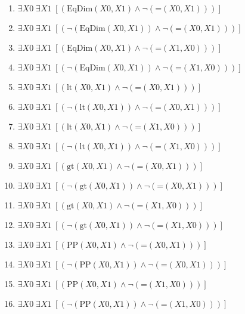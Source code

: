 \documentclass{article}
\begin{document}
\begin{enumerate}
\item $\exists X0\; \exists X1\;  \left[ \left(\textrm{EqDim}(X0,X1) \land \neg \left(\textrm{=}(X0,X1)\right)\right) \right]$
\item $\exists X0\; \exists X1\;  \left[ \left(\neg \left(\textrm{EqDim}(X0,X1)\right) \land \neg \left(\textrm{=}(X0,X1)\right)\right) \right]$
\item $\exists X0\; \exists X1\;  \left[ \left(\textrm{EqDim}(X0,X1) \land \neg \left(\textrm{=}(X1,X0)\right)\right) \right]$
\item $\exists X0\; \exists X1\;  \left[ \left(\neg \left(\textrm{EqDim}(X0,X1)\right) \land \neg \left(\textrm{=}(X1,X0)\right)\right) \right]$
\item $\exists X0\; \exists X1\;  \left[ \left(\textrm{lt}(X0,X1) \land \neg \left(\textrm{=}(X0,X1)\right)\right) \right]$
\item $\exists X0\; \exists X1\;  \left[ \left(\neg \left(\textrm{lt}(X0,X1)\right) \land \neg \left(\textrm{=}(X0,X1)\right)\right) \right]$
\item $\exists X0\; \exists X1\;  \left[ \left(\textrm{lt}(X0,X1) \land \neg \left(\textrm{=}(X1,X0)\right)\right) \right]$
\item $\exists X0\; \exists X1\;  \left[ \left(\neg \left(\textrm{lt}(X0,X1)\right) \land \neg \left(\textrm{=}(X1,X0)\right)\right) \right]$
\item $\exists X0\; \exists X1\;  \left[ \left(\textrm{gt}(X0,X1) \land \neg \left(\textrm{=}(X0,X1)\right)\right) \right]$
\item $\exists X0\; \exists X1\;  \left[ \left(\neg \left(\textrm{gt}(X0,X1)\right) \land \neg \left(\textrm{=}(X0,X1)\right)\right) \right]$
\item $\exists X0\; \exists X1\;  \left[ \left(\textrm{gt}(X0,X1) \land \neg \left(\textrm{=}(X1,X0)\right)\right) \right]$
\item $\exists X0\; \exists X1\;  \left[ \left(\neg \left(\textrm{gt}(X0,X1)\right) \land \neg \left(\textrm{=}(X1,X0)\right)\right) \right]$
\item $\exists X0\; \exists X1\;  \left[ \left(\textrm{PP}(X0,X1) \land \neg \left(\textrm{=}(X0,X1)\right)\right) \right]$
\item $\exists X0\; \exists X1\;  \left[ \left(\neg \left(\textrm{PP}(X0,X1)\right) \land \neg \left(\textrm{=}(X0,X1)\right)\right) \right]$
\item $\exists X0\; \exists X1\;  \left[ \left(\textrm{PP}(X0,X1) \land \neg \left(\textrm{=}(X1,X0)\right)\right) \right]$
\item $\exists X0\; \exists X1\;  \left[ \left(\neg \left(\textrm{PP}(X0,X1)\right) \land \neg \left(\textrm{=}(X1,X0)\right)\right) \right]$

\end{enumerate}
\end{document}
